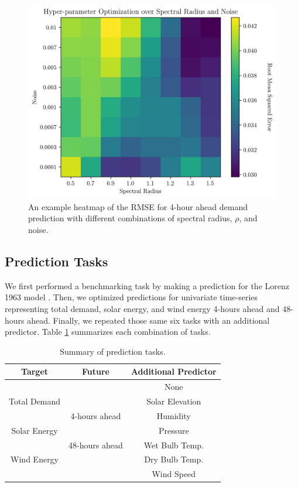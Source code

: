  \begin{figure}[h]
   \includegraphics[width=\columnwidth]{./images/04_demand_rho_noise_loss.png}
   \caption{An example heatmap of the RMSE for 4-hour ahead demand prediction with different combinations of spectral radius, $\rho$, and noise.}
   \label{fig:rhoxnoise-demand04}
 \end{figure}

 \subsection{Prediction Tasks}

We first performed a benchmarking task by making a prediction for the Lorenz
1963 model \cite{lorenz_deterministic_1963}. Then, we optimized predictions for
univariate time-series
representing total demand, solar energy, and wind energy 4-hours ahead and
48-hours ahead. Finally, we repeated those same six tasks with an additional
predictor. Table \ref{tab:tasks} summarizes each combination of tasks.

\begin{table}[h]
  \centering
  \caption{Summary of prediction tasks.}
  \label{tab:tasks}
  \begin{tabular}{c c c}
    \hline
    Target & Future & Additional Predictor\\
    \hline
    && None \\
    Total Demand && Solar Elevation\\
    &4-hours ahead& Humidity\\
    Solar Energy && Pressure\\
    &48-hours ahead& Wet Bulb Temp.\\
    Wind Energy && Dry Bulb Temp.\\
    && Wind Speed\\
    \hline
  \end{tabular}\\[-1.4pt]%

\end{table}
\FloatBarrier
